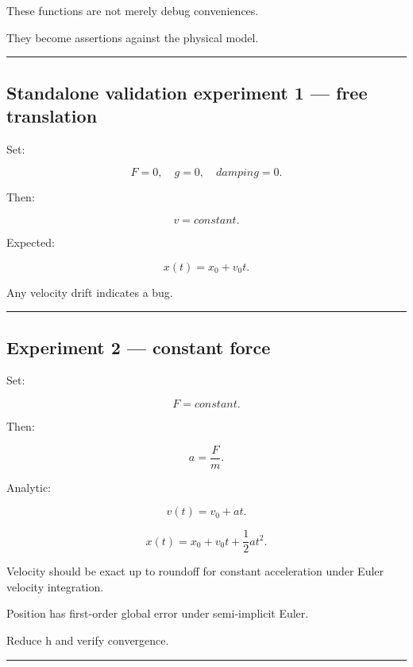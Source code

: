 These functions are not merely debug conveniences.

They become assertions against the physical model.

\begin{center}\rule{0.5\linewidth}{0.5pt}\end{center}

\subsection{Standalone validation experiment 1 --- free translation}\label{06-engine-ii-ch039-standalone-validation-experiment-1-free-translation}

\hypertarget{06-engine-ii-ch039-standalone-validation-experiment-1-free-translation}{}

Set:

\[
F=0,
\quad
g=0,
\quad
damping=0.
\]

Then:

\[
v=constant.
\]

Expected:

\[
x(t)
=
x_0+v_0t.
\]

Any velocity drift indicates a bug.

\begin{center}\rule{0.5\linewidth}{0.5pt}\end{center}

\subsection{Experiment 2 --- constant force}\label{06-engine-ii-ch039-experiment-2-constant-force}

\hypertarget{06-engine-ii-ch039-experiment-2-constant-force}{}

Set:

\[
F=constant.
\]

Then:

\[
a=\frac Fm.
\]

Analytic:

\[
v(t)=v_0+at.
\]

\[
x(t)
=
x_0+
v_0t+
\frac12at^2.
\]

Velocity should be exact up to roundoff for constant acceleration under Euler velocity integration.

Position has first-order global error under semi-implicit Euler.

Reduce h and verify convergence.

\begin{center}\rule{0.5\linewidth}{0.5pt}\end{center}

